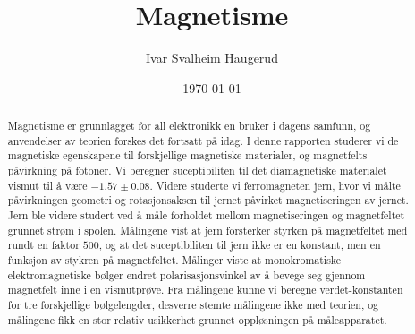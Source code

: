 \documentclass[%
 reprint,
 amsmath,amssymb,
 aps,
 norsk,
]{revtex4-1}
\begin{document}

\title{Magnetisme}%

\author{Ivar Svalheim Haugerud}

%

\date{\today}%

\begin{abstract}
Magnetisme er grunnlagget for all elektronikk en bruker i dagens samfunn, og anvendelser av teorien forskes det fortsatt på idag. I denne rapporten studerer vi de magnetiske egenskapene til forskjellige magnetiske materialer, og magnetfelts påvirkning på fotoner. Vi beregner suceptibiliten til det diamagnetiske materialet vismut til å være $-1.57\pm0.08$.
Videre studerte vi ferromagneten jern, hvor vi målte påvirkningen geometri og rotasjonsaksen til jernet påvirket magnetiseringen av jernet. Jern ble videre studert ved å måle forholdet mellom magnetiseringen og magnetfeltet grunnet strøm i spolen. Målingene vist at jern forsterker styrken på magnetfeltet med rundt en faktor $500$, og at det suceptibiliten til jern ikke er en konstant, men en funksjon av stykren på magnetfeltet. Målinger viste at monokromatiske elektromagnetiske bølger endret polarisasjonsvinkel av å bevege seg gjennom magnetfelt inne i en vismutprøve. Fra målingene kunne vi beregne verdet-konstanten for tre forskjellige bølgelengder, desverre stemte målingene ikke med teorien, og målingene fikk en stor relativ usikkerhet grunnet oppløsningen på måleapparatet.
\end{abstract}

\maketitle

\end{document}
